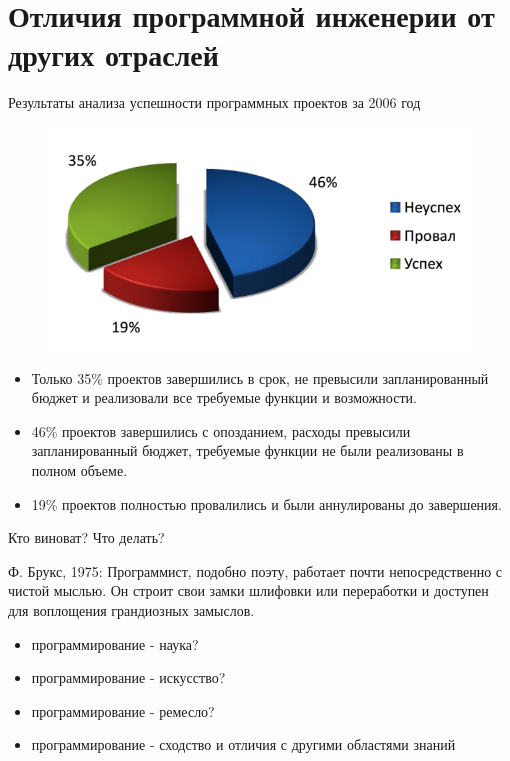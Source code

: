 \documentclass{beamer}
\begin{document}
\section{Отличия программной инженерии от других отраслей}
\begin{frame}[t]
Результаты анализа успешности программных проектов за 2006 год
\begin{figure}[h]
\centering
\includegraphics[scale=0.35]{images/lec01-pic02.png}
\label{pic-sort}
\end{figure}
\begin{itemize}
\item Только 35\% проектов завершились в срок, не превысили запланированный бюджет и реализовали все требуемые функции и возможности.
\item 46\% проектов завершились с опозданием, расходы превысили запланированный бюджет, требуемые функции не были реализованы в полном объеме.
\item 19\% проектов полностью провалились и были аннулированы до завершения.
\end{itemize}
Кто виноват? Что делать?
\end{frame} 

\begin{frame}[t]
\begin{block}{Ф. Брукс, 1975:} 
Программист, подобно поэту, работает почти непосредственно с чистой мыслью. Он строит свои замки шлифовки или переработки и доступен для воплощения грандиозных замыслов. 
\end{block}
\begin{itemize}
\item программирование - наука?
\item программирование - искусство?
\item программирование - ремесло?
\item программирование - сходство и отличия с другими областями знаний
\end{itemize}
\end{frame}
\end{document}
